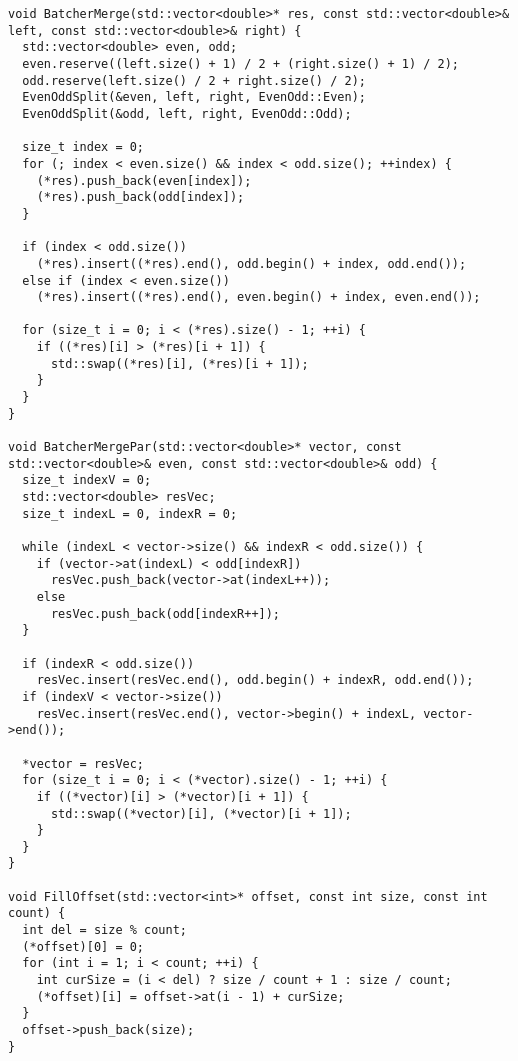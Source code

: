 \documentclass{report}
\begin{document}
\begin{lstlisting}
void BatcherMerge(std::vector<double>* res, const std::vector<double>& left, const std::vector<double>& right) {
  std::vector<double> even, odd;
  even.reserve((left.size() + 1) / 2 + (right.size() + 1) / 2);
  odd.reserve(left.size() / 2 + right.size() / 2);
  EvenOddSplit(&even, left, right, EvenOdd::Even);
  EvenOddSplit(&odd, left, right, EvenOdd::Odd);

  size_t index = 0;
  for (; index < even.size() && index < odd.size(); ++index) {
    (*res).push_back(even[index]);
    (*res).push_back(odd[index]);
  }

  if (index < odd.size())
    (*res).insert((*res).end(), odd.begin() + index, odd.end());
  else if (index < even.size())
    (*res).insert((*res).end(), even.begin() + index, even.end());

  for (size_t i = 0; i < (*res).size() - 1; ++i) {
    if ((*res)[i] > (*res)[i + 1]) {
      std::swap((*res)[i], (*res)[i + 1]);
    }
  }
}

void BatcherMergePar(std::vector<double>* vector, const std::vector<double>& even, const std::vector<double>& odd) {
  size_t indexV = 0;
  std::vector<double> resVec;
  size_t indexL = 0, indexR = 0;

  while (indexL < vector->size() && indexR < odd.size()) {
    if (vector->at(indexL) < odd[indexR])
      resVec.push_back(vector->at(indexL++));
    else
      resVec.push_back(odd[indexR++]);
  }

  if (indexR < odd.size())
    resVec.insert(resVec.end(), odd.begin() + indexR, odd.end());
  if (indexV < vector->size())
    resVec.insert(resVec.end(), vector->begin() + indexL, vector->end());

  *vector = resVec;
  for (size_t i = 0; i < (*vector).size() - 1; ++i) {
    if ((*vector)[i] > (*vector)[i + 1]) {
      std::swap((*vector)[i], (*vector)[i + 1]);
    }
  }
}

void FillOffset(std::vector<int>* offset, const int size, const int count) {
  int del = size % count;
  (*offset)[0] = 0;
  for (int i = 1; i < count; ++i) {
    int curSize = (i < del) ? size / count + 1 : size / count;
    (*offset)[i] = offset->at(i - 1) + curSize;
  }
  offset->push_back(size);
}
\end{lstlisting}
\end{document}
